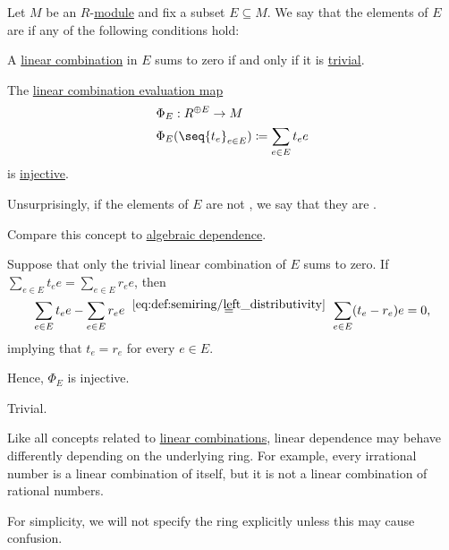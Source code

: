 \begin{definition}\label{def:linear_dependence}\mimprovised
  Let \( M \) be an \( R \)-\hyperref[def:module]{module} and fix a subset \( E \subseteq M \). We say that the elements of \( E \) are  if any of the following conditions hold:

  \begin{thmenum}
     A \hyperref[rem:linear_combinations]{linear combination} in \( E \) sums to zero if and only if it is \hyperref[def:free_semimodule]{trivial}.

     The \hyperref[thm:free_semimodule_universal_property]{linear combination evaluation map}
    \begin{equation*}
      \begin{aligned}
        &\Phi_E: R^{\oplus E} \to M \\
        &\Phi_E( \seq{ t_e }_{e \in E} ) \coloneqq \sum_{e \in E} t_e e
      \end{aligned}
    \end{equation*}
    is \hyperref[def:function_invertibility/injective]{injective}.
  \end{thmenum}

  Unsurprisingly, if the elements of \( E \) are not , we say that they are .

  Compare this concept to \hyperref[def:algebraic_dependence]{algebraic dependence}.
\end{definition}
\begin{defproof}
   Suppose that only the trivial linear combination of \( E \) sums to zero. If \( \sum_{e \in E} t_e e = \sum_{e \in E} r_e e \), then
  \begin{equation*}
    \sum_{e \in E} t_e e - \sum_{e \in E} r_e e
    \reloset {\eqref{eq:def:semiring/left_distributivity}} =
    \sum_{e \in E} (t_e - r_e) e
    =
    0,
  \end{equation*}
  implying that \( t_e = r_e \) for every \( e \in E \).

  Hence, \( \Phi_E \) is injective.

   Trivial.
\end{defproof}

\begin{remark}\label{rem:linear_dependence_ease_ring}
  Like all concepts related to \hyperref[rem:linear_combinations]{linear combinations}, linear dependence may behave differently depending on the underlying ring. For example, every irrational number is a linear combination of itself, but it is not a linear combination of rational numbers.

  For simplicity, we will not specify the ring explicitly unless this may cause confusion.
\end{remark}

